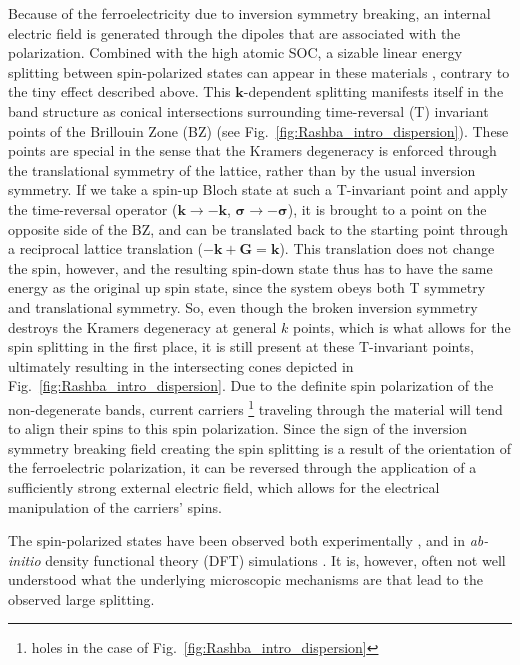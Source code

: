 Because of the ferroelectricity due to inversion symmetry breaking, an internal electric field is generated through the dipoles that are associated with the polarization.
Combined with the high atomic SOC, a sizable linear energy splitting between spin-polarized states can appear in these materials \cite{DiSante2013}, contrary to the tiny effect described above.
This $\bm k$-dependent splitting manifests itself in the band structure as conical intersections surrounding time-reversal (T) invariant points of the Brillouin Zone (BZ) (see Fig.~\ref{fig:Rashba_intro_dispersion}).
These points are special in the sense that the Kramers degeneracy \cite{Kramerstheorem} is enforced through the translational symmetry of the lattice, rather than by the usual inversion symmetry.
If we take a spin-up Bloch state at such a T-invariant point and apply the time-reversal operator ($\bm k \rightarrow \bm {-k}$, $\bm{\sigma} \rightarrow -\bm{\sigma}$), it is brought to a point on the opposite side of the BZ, and can be translated back to the starting point through a reciprocal lattice translation ($-\bm k + \bm G = \bm k$). This translation does not change the spin, however, and the resulting spin-down state thus has to have the same energy as the original up spin state, since the system obeys both T symmetry and translational symmetry.
So, even though the broken inversion symmetry destroys the Kramers degeneracy at general $k$ points, which is what allows for the spin splitting in the first place, it is still present at these T-invariant points, ultimately resulting in the intersecting cones depicted in Fig.~\ref{fig:Rashba_intro_dispersion}.
Due to the definite spin polarization of the non-degenerate bands, current carriers \footnote{holes in the case of Fig.~\ref{fig:Rashba_intro_dispersion}} traveling through the material will tend to align their spins to this spin polarization.
Since the sign of the inversion symmetry breaking field creating the spin splitting is a result of the orientation of the ferroelectric polarization, it can be reversed through the application of a sufficiently strong external electric field, which allows for the electrical manipulation of the carriers' spins.

The spin-polarized states have been observed both experimentally \cite{Ishizaka2011,Liebmann2016,Krempasky2015}, and in {\it ab-initio} density functional theory (DFT) simulations \cite{DiSante2013, Kim2014, Picozzi2014}.
It is, however, often not well understood what the underlying microscopic mechanisms are that lead to the observed large splitting.

